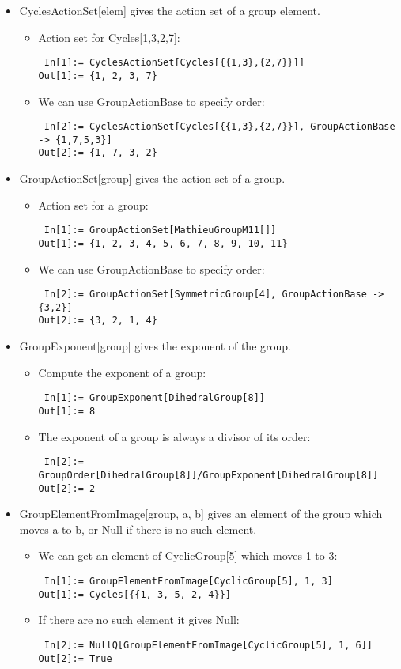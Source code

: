 \begin{itemize}
\item CyclesActionSet[elem] gives the action set of a group element.
\begin{itemize}
\item Action set for Cycles[{{1,3},{2,7}}]:
\begin{lstlisting}
 In[1]:= CyclesActionSet[Cycles[{{1,3},{2,7}}]]
Out[1]:= {1, 2, 3, 7}
\end{lstlisting}
\item We can use GroupActionBase to specify order:
\begin{lstlisting}
 In[2]:= CyclesActionSet[Cycles[{{1,3},{2,7}}], GroupActionBase -> {1,7,5,3}]
Out[2]:= {1, 7, 3, 2}
\end{lstlisting}
\end{itemize}

\item GroupActionSet[group] gives the action set of a group.
\begin{itemize}
\item Action set for a group:
\begin{lstlisting}
 In[1]:= GroupActionSet[MathieuGroupM11[]]
Out[1]:= {1, 2, 3, 4, 5, 6, 7, 8, 9, 10, 11}
\end{lstlisting}
\item We can use GroupActionBase to specify order:
\begin{lstlisting}
 In[2]:= GroupActionSet[SymmetricGroup[4], GroupActionBase -> {3,2}]
Out[2]:= {3, 2, 1, 4}
\end{lstlisting}
\end{itemize}

\item GroupExponent[group] gives the exponent of the group.
\begin{itemize}
\item Compute the exponent of a group:
\begin{lstlisting}
 In[1]:= GroupExponent[DihedralGroup[8]]
Out[1]:= 8
\end{lstlisting}
\item The exponent of a group is always a divisor of its order:
\begin{lstlisting}
 In[2]:= GroupOrder[DihedralGroup[8]]/GroupExponent[DihedralGroup[8]]
Out[2]:= 2
\end{lstlisting}
\end{itemize}

\item GroupElementFromImage[group, a, b] gives an element of the group which moves a to b, or Null if there is no such element.
\begin{itemize}
\item We can get an element of CyclicGroup[5] which moves 1 to 3:
\begin{lstlisting}
 In[1]:= GroupElementFromImage[CyclicGroup[5], 1, 3]
Out[1]:= Cycles[{{1, 3, 5, 2, 4}}]
\end{lstlisting}
\item If there are no such element it gives Null:
\begin{lstlisting}
 In[2]:= NullQ[GroupElementFromImage[CyclicGroup[5], 1, 6]]
Out[2]:= True
\end{lstlisting}
\end{itemize}


\end{itemize}

